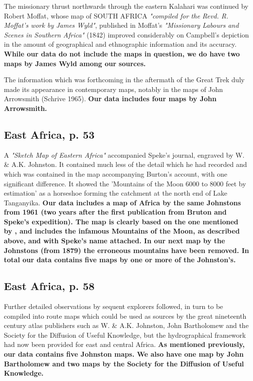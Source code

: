 \documentclass[12pt]{article}
\begin{document}
The missionary thrust northwards through the eastern Kalahari was continued by 
Robert Moffat, whose map of SOUTH AFRICA \textit{"compiled for the Revd. R. 
Moffat's work by James Wyld"}, published in Moffat's \textit{"Missionary Labours
and Scenes in Southern Africa"} (1842) improved considerably on Campbell's 
depiction in the amount of geographical and ethnographic information and its 
accuracy. \textbf{While our data do not include the maps in question, we do have
two maps by James Wyld among our sources.}

The information which was forthcoming in the aftermath of the Great Trek duly
made its appearance in contemporary maps, notably in the maps of John Arrowsmith
(Schrive 1965). \textbf{Our data includes four maps by John Arrowsmith.}

\subsection{East Africa, p. 53}

A \textit{"Sketch Map of Eastern Africa"} accompanied Speke's journal, engraved
by W. \& A.K. Johnston. It contained much less of the detail which he had
recorded and which was contained in the map accompanying Burton's account, with
one significant difference. It showed the 'Mountains of the Moon 6000 to 8000
feet by estimation' as a horseshoe forming the catchment at the north end of
Lake Tanganyika.  \textbf{Our data includes a map of Africa by the same
	Johnstons from 1961 (two years after the first publication from Bruton
	and Speke's expedition). The map is clearly based on the one mentioned
	by \citet{Stone1995}, and includes the infamous Mountains of the Moon,
	as described above, and with Speke's name attached. In our next map by
the Johnstons (from 1879) the erroneous mountains have been removed. In total
our data contains five maps by one or more of the Johnston's.}

\subsection{East Africa, p. 58}

Further detailed observations by sequent explorers followed, in turn to be
compiled into route maps which could be used as sources by the great nineteenth
century atlas publishers such as W. \& A.K. Johnston, John Bartholomew and the
Society for the Diffusion of Useful Knowledge, but the hydrographical framework
had now been provided for east and central Africa. \textbf{As mentioned
previously, our data contains five Johnston maps. We also have one map by John
Bartholomew and two maps by the Society for the Diffusion of Useful Knowledge.}
\end{document}
